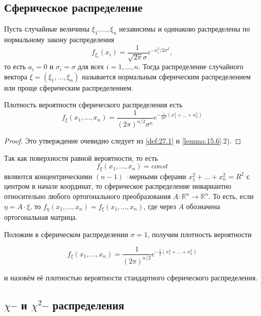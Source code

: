
\subsection{Сферическое распределение}

\begin{definition}
\label{def:27.1}
Пусть случайные величины $\xi_1 , \ldots , \xi_n$ независимы и одинаково распределены по нормальному закону распределения
%
$$f_{\xi_i}(x_i) = \frac{1}{\sqrt{2\pi} \sigma} e^{-x^2_i/2\sigma^2},$$
%
то есть $a_i = 0$ и $\sigma_i = \sigma$ для всех 
%
$i = 1, \ldots , n.$ 
%
Тогда распределение случайного вектора $\xi = (\xi_1 , \ldots , \xi_n )$ называется нормальным сферическим распределением или проще сферическим распределением.
\end{definition}

\begin{lemma}
\label{lemma:27.2}
 Плотность вероятности сферического распределения есть
$$f_{\xi} (x_1 , \ldots , x_n ) = \frac{1}{(2\pi)^{n/2}\sigma^n} e^{-\frac{1}{2\sigma^2}(x_1^1 + \ldots + x^2_n)}$$
 \end{lemma} 

 \begin{proof}
 Это утверждение очевидно следует из \ref{def:27.1} и \ref{lemma:15.6}.2).
 \end{proof}

\begin{zam}
\label{zam:27.3}
Так как поверхности равной вероятности, то есть
$$f_{\xi} (x_1 , \ldots , x_n ) = const$$
являются концентрическими $(n - 1)$ --мерными сферами $x^2_1 + \ldots + x^2_n = R^2$ 
с центром в начале координат, то сферическое распределение инвариантно относительно любого ортогонального преобразования
%
$A : \mathbb{R}^n \to \mathbb{R}^n$. 
%
То есть, если $\eta = A \cdot \xi$, то 
%
$f_{\eta}(x_1 , \ldots , x_n) = f_{\xi} (x_1 , \ldots , x_n )$,
%
где через $A$ обозначена ортогональная матрица.

Положим в сферическом распределении $\sigma = 1$, получим плотность вероятности

$$f_{\xi}(x_1, \ldots, x_n) = \frac{1}{(2\pi)^{n/2}}e^{-\frac{1}{2}(x_1^2 + \ldots + x_n^2)} $$

и назовём её плотностью вероятности стандартного сферического распределения.
\end{zam}

\subsection{$\chi$-- и $\chi^2$-- распределения}

